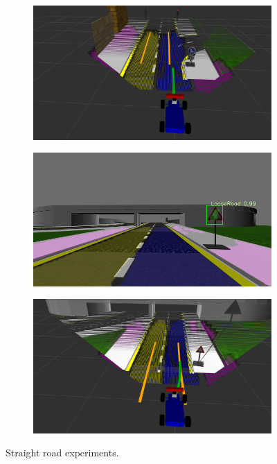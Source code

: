 \begin{figure}[h]
\begin{subfigure}[b]{0.45\linewidth}
  \end{subfigure}
  \begin{subfigure}[b]{0.45\linewidth}
      \includegraphics[width=\linewidth]{figures/experiments/straight-or-right-pc.png}
  \end{subfigure}
  \begin{subfigure}[b]{0.45\linewidth}
      \includegraphics[width=\linewidth]{figures/experiments/loose-road-img.png}
  \end{subfigure}
  \begin{subfigure}[b]{0.45\linewidth}
      \includegraphics[width=\linewidth]{figures/experiments/loose-road-pc.png}
  \end{subfigure}
  \caption{Straight road experiments.}
  \label{figure:normal-driving}
\end{figure}

